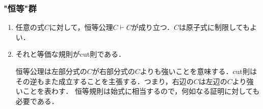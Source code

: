 \documentclass[a4paper,10pt,platex, dvipdfmx]{jsarticle}
\begin{document}
\subsubsection{"恒等"群}
\begin{enumerate}
\item 任意の式$C$に対して，恒等公理$C\vdash C$が成り立つ．$C$は原子式に制限してもよい．
\item それと等価な規則がcut則である．\begin{prooftree}
\end{prooftree}
恒等公理は左部分式の$C$が右部分式の$C$よりも強いことを意味する．cut則はその逆もまた成立することを主張する．つまり，右辺の$C$は左辺の$C$より強いことを表わす．
恒等規則は始式に相当するので，何如なる証明に対しても必要である．
\end{enumerate}
\end{document}
